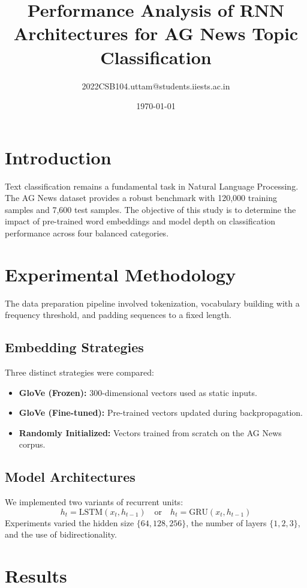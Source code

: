 \documentclass[11pt, a4paper]{article}
\title{Performance Analysis of RNN Architectures for AG News Topic Classification}
\author{2022CSB104.uttam@students.iiests.ac.in}
\date{\today}
\begin{document}
\maketitle



\section{Introduction}
Text classification remains a fundamental task in Natural Language Processing. The AG News dataset provides a robust benchmark with 120,000 training samples and 7,600 test samples. The objective of this study is to determine the impact of pre-trained word embeddings and model depth on classification performance across four balanced categories.

\section{Experimental Methodology}
The data preparation pipeline involved tokenization, vocabulary building with a frequency threshold, and padding sequences to a fixed length.

\subsection{Embedding Strategies}
Three distinct strategies were compared:
\begin{itemize}
    \item \textbf{GloVe (Frozen):} 300-dimensional vectors used as static inputs.
    \item \textbf{GloVe (Fine-tuned):} Pre-trained vectors updated during backpropagation.
    \item \textbf{Randomly Initialized:} Vectors trained from scratch on the AG News corpus.
\end{itemize}

\subsection{Model Architectures}
We implemented two variants of recurrent units:
\begin{equation}
    h_t = \text{LSTM}(x_t, h_{t-1}) \quad \text{or} \quad h_t = \text{GRU}(x_t, h_{t-1})
\end{equation}
Experiments varied the hidden size $\{64, 128, 256\}$, the number of layers $\{1, 2, 3\}$, and the use of bidirectionality.

\section{Results}
\end{document}
